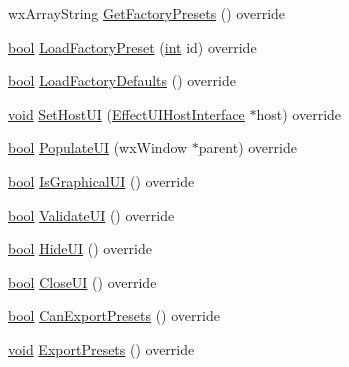 \begin{DoxyCompactItemize}
\item 
wx\+Array\+String \hyperlink{class_effect_a16db0079f2d96a8e4379eeec14653060}{Get\+Factory\+Presets} () override
\item 
\hyperlink{mac_2config_2i386_2lib-src_2libsoxr_2soxr-config_8h_abb452686968e48b67397da5f97445f5b}{bool} \hyperlink{class_effect_ac32c154a63c09d934de7423d055608c0}{Load\+Factory\+Preset} (\hyperlink{xmltok_8h_a5a0d4a5641ce434f1d23533f2b2e6653}{int} id) override
\item 
\hyperlink{mac_2config_2i386_2lib-src_2libsoxr_2soxr-config_8h_abb452686968e48b67397da5f97445f5b}{bool} \hyperlink{class_effect_a29827d153ead224ad480b33bd82b624b}{Load\+Factory\+Defaults} () override
\item 
\hyperlink{sound_8c_ae35f5844602719cf66324f4de2a658b3}{void} \hyperlink{class_effect_a615b807e0714789e0e07705d9a3153f3}{Set\+Host\+UI} (\hyperlink{class_effect_u_i_host_interface}{Effect\+U\+I\+Host\+Interface} $\ast$host) override
\item 
\hyperlink{mac_2config_2i386_2lib-src_2libsoxr_2soxr-config_8h_abb452686968e48b67397da5f97445f5b}{bool} \hyperlink{class_effect_a58462c34d8615fecb8c146b75ce669a5}{Populate\+UI} (wx\+Window $\ast$parent) override
\item 
\hyperlink{mac_2config_2i386_2lib-src_2libsoxr_2soxr-config_8h_abb452686968e48b67397da5f97445f5b}{bool} \hyperlink{class_effect_a28ba3b3f8d2120b52a69068b55183360}{Is\+Graphical\+UI} () override
\item 
\hyperlink{mac_2config_2i386_2lib-src_2libsoxr_2soxr-config_8h_abb452686968e48b67397da5f97445f5b}{bool} \hyperlink{class_effect_a0a8e03f2f00e28ebef32e25434b53f02}{Validate\+UI} () override
\item 
\hyperlink{mac_2config_2i386_2lib-src_2libsoxr_2soxr-config_8h_abb452686968e48b67397da5f97445f5b}{bool} \hyperlink{class_effect_ae4104d09ba21d0dd14a1d3387f57f677}{Hide\+UI} () override
\item 
\hyperlink{mac_2config_2i386_2lib-src_2libsoxr_2soxr-config_8h_abb452686968e48b67397da5f97445f5b}{bool} \hyperlink{class_effect_ac435ffaf299ac5a6a7c11981f92116dd}{Close\+UI} () override
\item 
\hyperlink{mac_2config_2i386_2lib-src_2libsoxr_2soxr-config_8h_abb452686968e48b67397da5f97445f5b}{bool} \hyperlink{class_effect_ae188f1596e647af26353f8eb22765592}{Can\+Export\+Presets} () override
\item 
\hyperlink{sound_8c_ae35f5844602719cf66324f4de2a658b3}{void} \hyperlink{class_effect_a7211f74dc5b63127799bbf32cc51bcf1}{Export\+Presets} () override

\end{DoxyCompactItemize}

